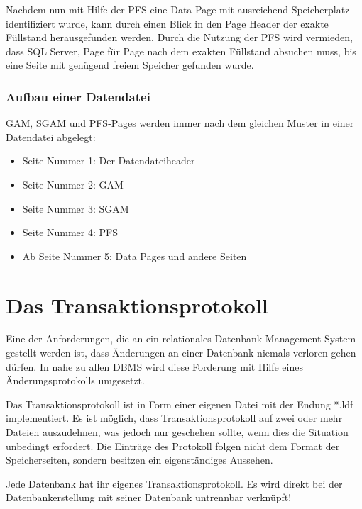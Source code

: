        Nachdem nun mit Hilfe der PFS eine Data Page mit ausreichend
        Speicherplatz identifiziert wurde, kann durch einen Blick in den Page
        Header der exakte Füllstand herausgefunden werden. Durch die Nutzung
        der PFS wird vermieden, dass SQL Server, Page für Page nach dem
        exakten Füllstand absuchen muss, bis eine Seite mit genügend freiem
        Speicher gefunden wurde.
      \subsubsection{Aufbau einer Datendatei}
        GAM, SGAM und PFS-Pages werden immer nach dem gleichen Muster in einer
        Datendatei abgelegt:
        \begin{itemize}
          \item Seite Nummer 1: Der Datendateiheader
          \item Seite Nummer 2: GAM
          \item Seite Nummer 3: SGAM
          \item Seite Nummer 4: PFS
          \item Ab Seite Nummer 5: Data Pages und andere Seiten
        \end{itemize}
    \section{Das Transaktionsprotokoll}
      Eine der Anforderungen, die an ein relationales Datenbank Management
      System gestellt werden ist, dass Änderungen an einer Datenbank niemals
      verloren gehen dürfen. In nahe zu allen DBMS wird diese Forderung mit
      Hilfe eines Änderungsprotokolls umgesetzt.
      
      Das Transaktionsprotokoll ist in Form einer eigenen Datei mit der
      Endung *.ldf implementiert. Es ist möglich, dass Transaktionsprotokoll
      auf zwei oder mehr Dateien auszudehnen, was jedoch nur geschehen
      sollte, wenn dies die Situation unbedingt erfordert. Die Einträge des
      Protokoll folgen nicht dem Format der Speicherseiten, sondern besitzen
      ein eigenständiges Aussehen.
      \begin{merke}
        Jede Datenbank hat ihr eigenes Transaktionsprotokoll. Es wird direkt
        bei der Datenbankerstellung mit seiner Datenbank untrennbar
        verknüpft!
      \end{merke}
